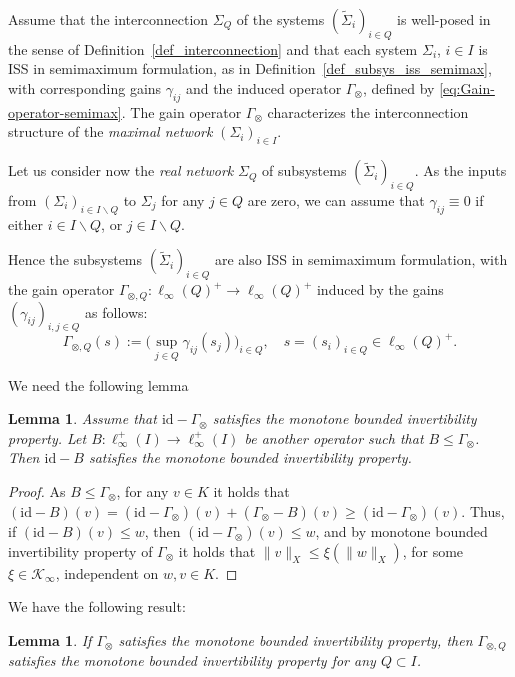 \documentclass[twocolumn]{IEEEtran} %
\newtheorem{lemma}[theorem]{Lemma}
\theoremstyle{definition}
\newcommand{\Kinf}{\mathcal{K_\infty}}%
\newcommand{\id}{\mathrm{id}}%
\begin{document}
Assume that the interconnection $\Sigma_Q$ of the systems $(\tilde{\Sigma}_i)_{i\in Q}$ is well-posed in the sense of Definition~\ref{def_interconnection} and that each system $\Sigma_i$, $i\in I$ is ISS in semimaximum formulation, as in Definition~\ref{def_subsys_iss_semimax}, with corresponding gains $\gamma_{ij}$ and the induced operator $\Gamma_{\otimes}$, defined by \eqref{eq:Gain-operator-semimax}.
The gain operator $\Gamma_{\otimes}$ characterizes the interconnection structure of the \emph{maximal network} $(\Sigma_i)_{i\in I}$.

Let us consider now the \emph{real network} $\Sigma_Q$ of subsystems $(\tilde{\Sigma}_i)_{i\in Q}$.
As the inputs from $(\Sigma_i)_{i\in I\backslash Q}$ to $\Sigma_j$ for any $j\in Q$ are zero, we can assume that 
$\gamma_{ij}\equiv 0$ if either $i\in I\backslash Q$, or $j\in I\backslash Q$.

Hence the subsystems  $(\tilde{\Sigma}_i)_{i\in Q}$ are also ISS in semimaximum formulation, with the gain operator
$\Gamma_{\otimes,Q}:\ell_{\infty}(Q)^+ \rightarrow \ell_{\infty}(Q)^+$ induced by the gains $(\gamma_{ij})_{i,j\in Q}$ as follows:%
\begin{equation}
\label{eq:Gain-operator-semimax-restricted}
  \Gamma_{\otimes,Q}(s) := \bigl(\sup_{j\in Q}\gamma_{ij}(s_j)\bigr)_{i\in Q},\quad s = (s_i)_{i\in Q} \in \ell_{\infty}(Q)^+.%
\end{equation}

We need the following lemma 
\begin{lemma}
\label{lem:Monotone-invertibility-of-smaller-operators} 
Assume that $\id - \Gamma_\otimes$ satisfies the monotone bounded invertibility property. Let $B:\ell_\infty^+(I) \rightarrow \ell_\infty^+(I)$ be another operator such that $B \leq \Gamma_\otimes$.
Then $\id - B$ satisfies the monotone bounded invertibility property.
\end{lemma}

\begin{proof}
As $B\leq \Gamma_\otimes$, for any $v\in K$ it holds that  $(\id - B)(v) = (\id - \Gamma_\otimes)(v) + (\Gamma_\otimes-B)(v)\geq (\id - \Gamma_\otimes)(v)$.
Thus, if $(\id - B)(v) \leq w$, then $(\id - \Gamma_\otimes)(v) \leq w$, and by monotone bounded invertibility property of $\Gamma_\otimes$
it holds that $\|v\|_X \leq \xi(\|w\|_X)$, for some $\xi\in\Kinf$, independent on $w,v\in K$.
\end{proof}




We have the following result:
\begin{lemma}
\label{lem:Monotone-invertibility-restricted-gain-operators} 
If $\Gamma_{\otimes}$ satisfies the monotone bounded invertibility property, then $\Gamma_{\otimes,Q}$ satisfies the monotone bounded invertibility property for any $Q \subset I$.
\end{lemma}
\end{document}

